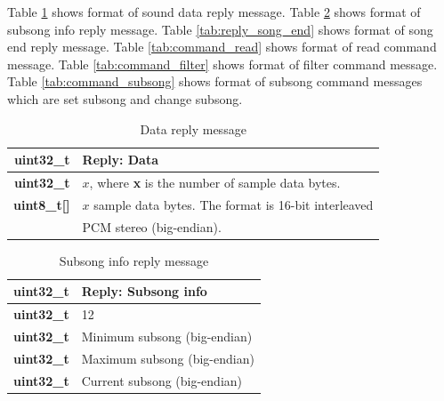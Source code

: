 \documentclass{article}
\begin{document}
Table \ref{tab:reply_data} shows format of sound data reply message.
Table \ref{tab:reply_subsong_info} shows format of subsong info reply message.
Table \ref{tab:reply_song_end} shows format of song end reply message.
Table \ref{tab:command_read} shows format of read command message.
Table \ref{tab:command_filter} shows format of filter command message.
Table \ref{tab:command_subsong} shows format of subsong command messages
which are set subsong and change subsong.

\begin{table}
\begin{center}
\caption{Data reply message}
\label{tab:reply_data}
\begin{tabular}{|r|l|}
\hline
\textbf{uint32\_t} & Reply: Data \\
\hline
\textbf{uint32\_t} & $x$, where \textbf{x} is the number of sample
data bytes.\\
\hline
\textbf{uint8\_t[]} & $x$ sample data bytes. The format is 16-bit interleaved\\
& PCM stereo (big-endian).\\
\hline
\end{tabular}
\end{center}
\end{table}

\begin{table}
\begin{center}
\caption{Subsong info reply message}
\label{tab:reply_subsong_info}
\begin{tabular}{|r|l|}
\hline
\textbf{uint32\_t} & Reply: Subsong info \\
\hline
\textbf{uint32\_t} & 12\\
\hline
\textbf{uint32\_t} & Minimum subsong (big-endian)\\
\hline
\textbf{uint32\_t} & Maximum subsong (big-endian)\\
\hline
\textbf{uint32\_t} & Current subsong (big-endian)\\
\hline
\end{tabular}
\end{center}
\end{table}
\end{document}
